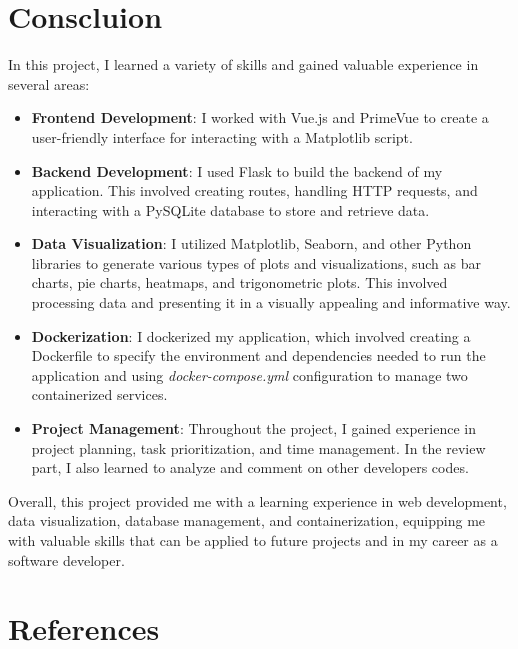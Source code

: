 \documentclass[sn-mathphys-num]{sn-jnl}%
\theoremstyle{thmstyleone}%
\theoremstyle{thmstyletwo}%
\theoremstyle{thmstylethree}%
\begin{document}
\section{Conscluion}\label{sec7}

In this project, I learned a variety of skills and gained valuable experience in several areas:
\begin{itemize}
    \item \textbf{Frontend Development}: I worked with Vue.js and PrimeVue to create a user-friendly interface for interacting with a Matplotlib script.
    \item \textbf{Backend Development}: I used Flask to build the backend of my application. This involved creating routes, handling HTTP requests, and interacting with a PySQLite database to store and retrieve data.
    \item \textbf{Data Visualization}: I utilized Matplotlib, Seaborn, and other Python libraries to generate various types of plots and visualizations, such as bar charts, pie charts, heatmaps, and trigonometric plots. This involved processing data and presenting it in a visually appealing and informative way.
    \item \textbf{Dockerization}: I dockerized my application, which involved creating a Dockerfile to specify the environment and dependencies needed to run the application and using \textit{docker-compose.yml} configuration to manage two containerized services.
    \item \textbf{Project Management}: Throughout the project, I gained experience in project planning, task prioritization, and time management. In the review part, I also learned to analyze and comment on other developers codes.
\end{itemize}

Overall, this project provided me with a learning experience in web development, data visualization, database management, and containerization, equipping me with valuable skills that can be applied to future projects and in my career as a software developer.

\section{References}\label{sec10}
\end{document}
